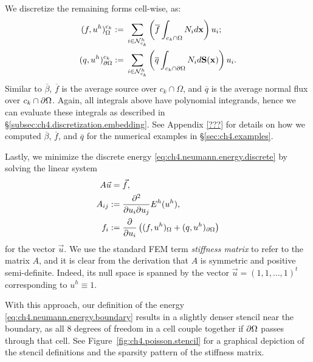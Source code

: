 We discretize the remaining forms cell-wise, as:
\begin{align*}
(f, u^h)^{c_k}_{\Omega} := {} & \sum_{i \in \mathcal{N}^h_{c_k}} \left( \overline{f} \int_{c_k \cap \Omega} N_i d\mathbf{x} \right) u_i; \\
(q, u^h)^{c_k}_{\partial\Omega} := {} & \sum_{i \in \mathcal{N}^h_{c_k}} \left( \overline{q} \int_{c_k \cap \partial\Omega} N_i d\mathbf{S}(\mathbf{x}) \right) u_i.
\end{align*}
Similar to $\overline{\beta}$, $\overline{f}$ is the average source over $c_k \cap \Omega$, and $\overline{q}$ is the average normal flux over $c_k \cap \partial\Omega$. Again, all integrals above have polynomial integrands, hence we can evaluate these integrals as described in \S\ref{subsec:ch4.discretization.embedding}. See Appendix \ref{???} for details on how we computed $\overline{\beta}$, $\overline{f}$, and $\overline{q}$ for the numerical examples in \S\ref{sec:ch4.examples}.

Lastly, we minimize the discrete energy \eqref{eq:ch4.neumann.energy.discrete} by solving the linear system
\begin{equation} \label{eq:ch4.neumann.linear.system}
\begin{split}
A \vec{u} = {} & \vec{f}, \\
A_{ij} := {} & \frac{\partial^2 }{\partial u_i \partial u_j} E^h(u^h), \\
f_i := {} & \frac{\partial }{\partial u_i} \left( (f, u^h)_{\Omega} + (q, u^h)_{\partial\Omega} \right)
\end{split}
\end{equation}
for the vector $\vec{u}$. We use the standard FEM term \emph{stiffness matrix} to refer to the matrix $A$, and it is clear from the derivation that $A$ is symmetric and positive semi-definite. Indeed, its null space is spanned by the vector $\vec{u} = (1, 1, \dotsc, 1)^t$ corresponding to $u^h \equiv 1$.

With this approach, our definition of the energy \eqref{eq:ch4.neumann.energy.boundary} results in a slightly denser stencil near the boundary, as all $8$ degrees of freedom in a cell couple together if $\partial\Omega$ passes through that cell. See Figure~\ref{fig:ch4.poisson.stencil} for a graphical depiction of the stencil definitions and the sparsity pattern of the stiffness matrix.

